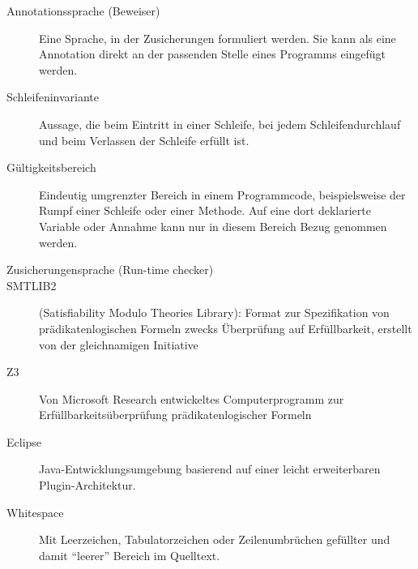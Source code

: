 \begin{description}
    \item[Annotationssprache (Beweiser)] Eine Sprache, in der \see Zusicherungen formuliert werden. Sie kann als eine Annotation direkt an der passenden Stelle eines Programms eingefügt werden.
    \item[Schleifeninvariante] Aussage, die beim Eintritt in einer Schleife, bei jedem Schleifendurchlauf und beim Verlassen der Schleife erfüllt ist.
    \item[Gültigkeitsbereich] Eindeutig umgrenzter Bereich in einem Programmcode, beispielsweise der Rumpf einer Schleife oder einer Methode. Auf eine dort deklarierte Variable oder Annahme kann nur in diesem Bereich Bezug genommen werden.
    \item[Zusicherungensprache (Run-time checker)]
    \item[SMTLIB2] (Satisfiability Modulo Theories Library): Format zur Spezifikation von prädikatenlogischen Formeln zwecks Überprüfung auf Erfüllbarkeit, erstellt von der gleichnamigen Initiative
    \item[Z3] Von Microsoft Research entwickeltes Computerprogramm zur Erfüllbarkeitsüberprüfung prädikatenlogischer Formeln
    \item[Eclipse] Java-Entwicklungsumgebung basierend auf einer leicht erweiterbaren Plugin-Architektur.
    \item[Whitespace] Mit Leerzeichen, Tabulatorzeichen oder Zeilenumbrüchen gefüllter und damit "`leerer"' Bereich im Quelltext.
\end{description}

